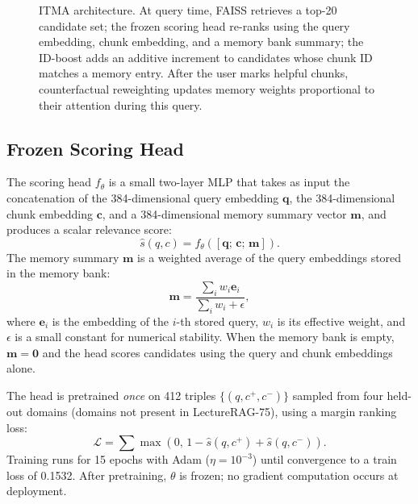 \documentclass[preprint,12pt]{elsarticle}
\begin{document}
\begin{figure}[htbp]
\caption{ITMA architecture.  At query time, FAISS retrieves a top-20
candidate set; the frozen scoring head re-ranks using the query embedding,
chunk embedding, and a memory bank summary; the ID-boost adds an additive
increment to candidates whose chunk ID matches a memory entry.  After the
user marks helpful chunks, counterfactual reweighting updates memory weights
proportional to their attention during this query.}
\label{fig:arch}
\end{figure}

\subsection{Frozen Scoring Head}
\label{sec:head}
The scoring head $f_\theta$ is a small two-layer MLP that takes as input the
concatenation of the 384-dimensional query embedding $\mathbf{q}$, the
384-dimensional chunk embedding $\mathbf{c}$, and a 384-dimensional memory
summary vector $\mathbf{m}$, and produces a scalar relevance score:
\begin{equation}
\hat{s}(q, c) = f_\theta([\mathbf{q};\,\mathbf{c};\,\mathbf{m}]).
\label{eq:head}
\end{equation}
The memory summary $\mathbf{m}$ is a weighted average of the query embeddings
stored in the memory bank:
\begin{equation}
\mathbf{m} = \frac{\sum_{i} w_i \mathbf{e}_i}{\sum_{i} w_i + \epsilon},
\label{eq:summary}
\end{equation}
where $\mathbf{e}_i$ is the embedding of the $i$-th stored query, $w_i$ is its
effective weight, and $\epsilon$ is a small constant for numerical stability.
When the memory bank is empty, $\mathbf{m}=\mathbf{0}$ and the head scores
candidates using the query and chunk embeddings alone.

The head is pretrained \emph{once} on 412 triples
$\{(q, c^+, c^-)\}$ sampled from four held-out domains (domains not present in
LectureRAG-75), using a margin ranking loss:
\begin{equation}
\mathcal{L} = \sum \max(0,\,1 - \hat{s}(q,c^+) + \hat{s}(q,c^-)).
\label{eq:loss}
\end{equation}
Training runs for 15 epochs with Adam ($\eta=10^{-3}$) until convergence to
a train loss of 0.1532.  After pretraining, $\theta$ is frozen; no gradient
computation occurs at deployment.
\end{document}
